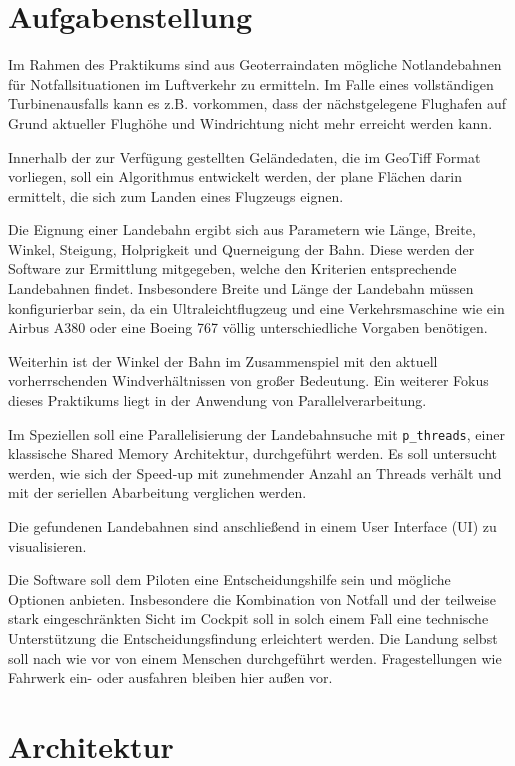 \documentclass[10pt,a4paper]{report}
\begin{document}
\chapter{Aufgabenstellung}

Im Rahmen des Praktikums sind aus Geoterraindaten mögliche Notlandebahnen für Notfallsituationen im Luftverkehr zu ermitteln. Im Falle eines vollständigen Turbinenausfalls kann es z.B. vorkommen, dass der nächstgelegene Flughafen auf Grund aktueller Flughöhe und Windrichtung nicht mehr erreicht werden kann.

Innerhalb der zur Verfügung gestellten Geländedaten, die im GeoTiff Format vorliegen, soll ein Algorithmus entwickelt werden, der plane Flächen darin ermittelt, die sich zum Landen eines Flugzeugs eignen.

Die Eignung einer Landebahn ergibt sich aus Parametern wie Länge, Breite, Winkel, Steigung, Holprigkeit und Querneigung der Bahn.
Diese werden der Software zur Ermittlung mitgegeben, welche den Kriterien entsprechende Landebahnen findet.
Insbesondere Breite und Länge der Landebahn müssen konfigurierbar sein, da ein Ultraleichtflugzeug und eine Verkehrsmaschine wie ein Airbus A380 oder eine Boeing 767 völlig unterschiedliche Vorgaben benötigen.

Weiterhin ist der Winkel der Bahn im Zusammenspiel mit den aktuell vorherrschenden Windverhältnissen von großer Bedeutung. 
Ein weiterer Fokus dieses Praktikums liegt in der Anwendung von Parallelverarbeitung.

Im Speziellen soll eine Parallelisierung der Landebahnsuche mit \texttt{p\_threads}, einer klassische Shared Memory Architektur, durchgeführt werden.
Es soll untersucht werden, wie sich der Speed-up mit zunehmender Anzahl an Threads verhält und mit der seriellen Abarbeitung verglichen werden.

Die gefundenen Landebahnen sind anschließend in einem User Interface (UI) zu visualisieren.

Die Software soll dem Piloten eine Entscheidungshilfe sein und mögliche Optionen anbieten. Insbesondere die Kombination von Notfall und der teilweise stark eingeschränkten Sicht im Cockpit soll in solch einem Fall eine technische Unterstützung die Entscheidungsfindung erleichtert werden.
Die Landung selbst soll nach wie vor von einem Menschen durchgeführt werden. Fragestellungen wie Fahrwerk ein- oder ausfahren bleiben hier außen vor.     

\chapter{Architektur}
\end{document}

